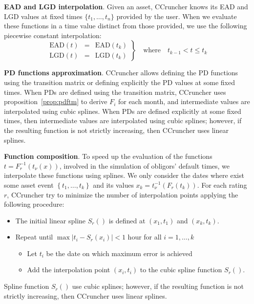 \documentclass[11pt,fleqn]{book} %
\begin{document}
\textbf{EAD and LGD interpolation}. Given an asset, CCruncher knows its EAD 
and LGD values at fixed times $\{t_1,\dots,t_n\}$ provided by the user. When 
we evaluate these functions in a time value distinct from those provided, we 
use the following piecewise constant interpolation:
\begin{displaymath}
  \left.
	\begin{array}{rcl}
		\text{EAD}(t) & = & \text{EAD}(t_k) \\
		\text{LGD}(t) & = & \text{LGD}(t_k)
	\end{array}
	\right\}
	\quad \text{where} \quad t_{k-1} < t \le t_{k}
\end{displaymath}

\textbf{PD functions approximation}. CCruncher allows defining the PD
functions using the transition matrix or defining explicitly the PD values
at some fixed times. When PDs are defined using the transition matrix, 
CCruncher uses proposition~\ref{prop:pdftm} to derive $F_i$ for each 
month, and intermediate values are interpolated using cubic splines. 
When PDs are defined explicitly at some fixed times, then intermediate 
values are interpolated using cubic splines; however, if the resulting 
function is not strictly increasing, then CCruncher uses linear splines.

\textbf{Function composition}. To speed up the evaluation of the functions 
$t=F_r^{-1}(t_{\nu}(x))$, involved in the simulation of obligors' default 
times, we interpolate these functions using splines. We only consider the 
dates where exist some asset event $\left\{t_1,\dots,t_k\right\}$ and its 
values $x_k=t_{\nu}^{-1}(F_r(t_k))$. For each rating $r$, CCruncher try to 
minimize the number of interpolation points applying the following procedure:
\begin{itemize}
	\item The initial linear spline $S_r()$ is defined at $(x_1,t_1)$ and $(x_k,t_k)$.
	\item Repeat until $\displaystyle \max\left|t_i - S_r(x_i)\right| < 1$ hour for all $i=1,\dots,k$
	\begin{itemize}
		\item Let $t_i$ be the date on which maximum error is achieved
		\item Add the interpolation point $(x_i,t_i)$ to the cubic spline function $S_r()$.
	\end{itemize}
\end{itemize}
Spline function $S_r()$ use cubic splines; however, if the resulting function 
is not strictly increasing, then CCruncher uses linear splines.
\end{document}

